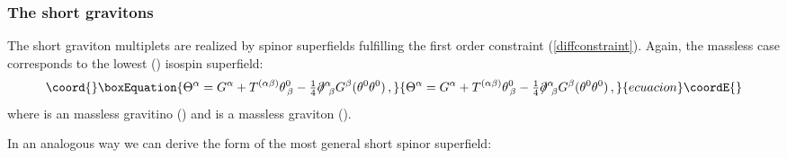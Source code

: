 \documentclass[a4paper,12pt]{article}
\providecommand{\ft}[2]{{\textstyle\frac{#1}{#2}}}
\begin{document}
\subsubsection{The \coordHE{} short gravitons}
The \coordHE{} short graviton multiplets are realized by spinor
superfields fulfilling the first order constraint (\ref{diffconstraint}).
Again, the massless case corresponds to the lowest (\coordHE{}) isospin
superfield:
\begin{equation}\coord{}\boxEquation{
\Theta^\alpha=G^\alpha+T^{(\alpha\beta)}\theta^0_{\,\beta}-\ft{1}{4}
\partial\!\!\!/^\alpha_{\ \beta}G^\beta(\theta^0\theta^0)\,,
\label{J=0shgraviton}
}{
\Theta^\alpha=G^\alpha+T^{(\alpha\beta)}\theta^0_{\,\beta}-\ft{1}{4}
\partial\!\!\!/^\alpha_{\ \beta}G^\beta(\theta^0\theta^0)\,,
}{ecuacion}\coordE{}\end{equation}
where \coordHE{} is an \coordHE{} massless gravitino
(\coordHE{}) and \coordHE{}
is a massless graviton (\coordHE{}).
\par
In an analogous way we can derive the form of the most general
\coordHE{} short spinor superfield:
\end{document}
